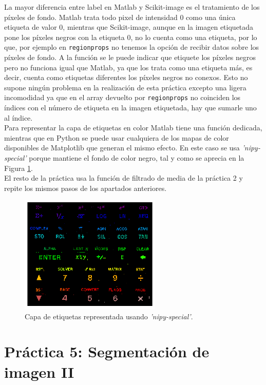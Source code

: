 La mayor diferencia entre label en Matlab y Scikit-image es el tratamiento de los píxeles de fondo. Matlab trata todo pixel de intensidad 0 como una única etiqueta de valor 0, mientras que Scikit-image, aunque en la imagen etiquetada pone los píxeles negros con la etiqueta 0, no lo cuenta como una etiqueta, por lo que, por ejemplo en \texttt{regionprops} no tenemos la opción de recibir datos sobre los píxeles de fondo. A la función se le puede indicar que etiquete los píxeles negros pero no funciona igual que Matlab, ya que los trata como una etiqueta más, es decir, cuenta como etiquetas diferentes los píxeles negros no conexos. Esto no supone ningún problema en la realización de esta práctica excepto una ligera incomodidad ya que en el array devuelto por \texttt{regionprops} no coinciden los índices con el número de etiqueta en la imagen etiquetada, hay que sumarle uno al índice.\\

Para representar la capa de etiquetas en color Matlab tiene una función dedicada, mientras que en Python se puede usar cualquiera de los mapas de color disponibles de Matplotlib que generan el mismo efecto. En este caso se usa \emph{'nipy-special'} porque mantiene el fondo de color negro, tal y como se aprecia en la Figura \ref{color}.\\

El resto de la práctica usa la función de filtrado de media de la práctica 2 y repite los mismos pasos de los apartados anteriores.

\begin{figure}[h]
\centering
\includegraphics[width=0.6\textwidth]{imagenes/color}
\caption{Capa de etiquetas representada usando \emph{'nipy-special'}.}
\label{color}
\end{figure}


\section{Práctica 5: Segmentación de imagen II}
